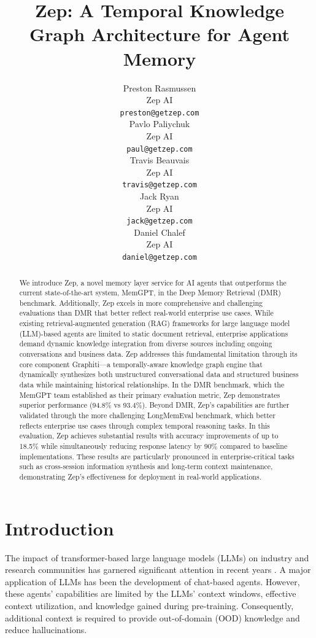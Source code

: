 \documentclass{article}
\title{Zep: A Temporal Knowledge Graph Architecture for Agent Memory
}
\author{
  Preston Rasmussen \\
  Zep AI \\
  \texttt{preston@getzep.com} \\
   \And
  Pavlo Paliychuk  \\
  Zep AI \\
  \texttt{paul@getzep.com} \\
     \And
  Travis Beauvais \\
  Zep AI \\
  \texttt{travis@getzep.com} \\   \And
  Jack Ryan  \\
  Zep AI \\
  \texttt{jack@getzep.com} \\   \And
  Daniel Chalef  \\
  Zep AI \\
  \texttt{daniel@getzep.com} \\
}
\begin{document}
\maketitle


\begin{abstract}
We introduce Zep, a novel memory layer service for AI agents that outperforms the current state-of-the-art system, MemGPT, in the Deep Memory Retrieval (DMR) benchmark. Additionally, Zep excels in more comprehensive and challenging evaluations than DMR that better reflect real-world enterprise use cases. While existing retrieval-augmented generation (RAG) frameworks for large language model (LLM)-based agents are limited to static document retrieval, enterprise applications demand dynamic knowledge integration from diverse sources including ongoing conversations and business data. Zep addresses this fundamental limitation through its core component Graphiti---a temporally-aware knowledge graph engine that dynamically synthesizes both unstructured conversational data and structured business data while maintaining historical relationships. In the DMR benchmark, which the MemGPT team established as their primary evaluation metric, Zep demonstrates superior performance (94.8\% vs 93.4\%). Beyond DMR, Zep's capabilities are further validated through the more challenging LongMemEval benchmark, which better reflects enterprise use cases through complex temporal reasoning tasks. In this evaluation, Zep achieves substantial results with accuracy improvements of up to 18.5\% while simultaneously reducing response latency by 90\% compared to baseline implementations. These results are particularly pronounced in enterprise-critical tasks such as cross-session information synthesis and long-term context maintenance, demonstrating Zep's effectiveness for deployment in real-world applications.
\end{abstract}




\section{Introduction}
The impact of transformer-based large language models (LLMs) on industry and research communities has garnered significant attention in recent years \cite{attentionneed}. A major application of LLMs has been the development of chat-based agents. However, these agents' capabilities are limited by the LLMs' context windows, effective context utilization, and knowledge gained during pre-training. Consequently, additional context is required to provide out-of-domain (OOD) knowledge and reduce hallucinations.
\end{document}
